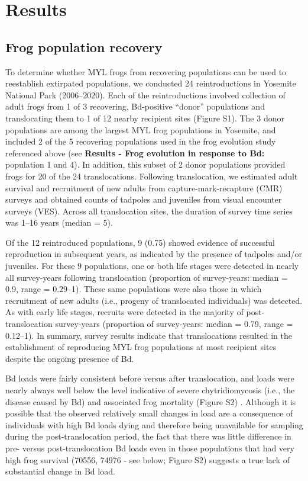 \documentclass[9pt,twocolumn,twoside,lineno]{pnas-new}
\begin{document}
\section*{Results}

\subsection*{Frog population recovery}

To determine whether MYL frogs from recovering populations can be used
to reestablish extirpated populations, we conducted 24 reintroductions
in Yosemite National Park (2006--2020). Each of the reintroductions
involved collection of adult frogs from 1 of 3 recovering, Bd-positive
``donor'' populations and translocating them to 1 of 12 nearby recipient
sites (Figure S1). The 3 donor populations are among
the largest MYL frog populations in Yosemite, and included 2 of the 5
recovering populations used in the frog evolution study referenced above
(see \textbf{Results - Frog evolution in response to Bd:} population 1
and 4). In addition, this subset of 2 donor populations provided frogs
for 20 of the 24 translocations. Following translocation, we estimated
adult survival and recruitment of new adults from capture-mark-recapture
(CMR) surveys and obtained counts of tadpoles and juveniles from visual
encounter surveys (VES). Across all translocation sites, the duration of
survey time series was 1--16 years (median = 5).

Of the 12 reintroduced populations, 9 (0.75) showed evidence of
successful reproduction in subsequent years, as indicated by the
presence of tadpoles and/or juveniles. For these 9 populations, one or
both life stages were detected in nearly all survey-years following
translocation (proportion of survey-years: median = 0.9, range =
0.29--1). These same populations were also those in which recruitment of
new adults (i.e., progeny of translocated individuals) was detected. As
with early life stages, recruits were detected in the majority of
post-translocation survey-years (proportion of survey-years: median =
0.79, range = 0.12--1). In summary, survey results indicate that
translocations resulted in the establishment of reproducing MYL frog
populations at most recipient sites despite the ongoing presence of Bd.

Bd loads were fairly consistent before versus after translocation, and
loads were nearly always well below the level indicative of severe
chytridiomycosis (i.e., the disease caused by Bd) and associated frog
mortality (Figure S2)
\citep{joseph2018, vredenburg2010}. Although it is possible that the
observed relatively small changes in load are a consequence of
individuals with high Bd loads dying and therefore being unavailable for
sampling during the post-translocation period, the fact that there was
little difference in pre- versus post-translocation Bd loads even in
those populations that had very high frog survival (70556, 74976 - see
below; Figure S2) suggests a true lack of
substantial change in Bd load.
\end{document}
